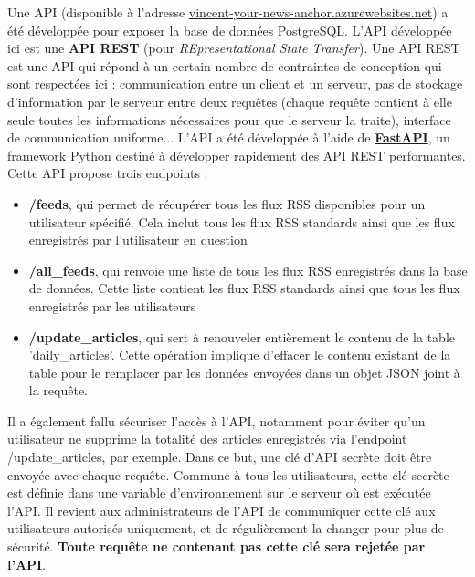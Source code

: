 \documentclass[french]{article}
\begin{document}
    Une API (disponible à l'adresse \href{https://vincent-your-news-anchor.azurewebsites.net/doc}{vincent-your-news-anchor.azurewebsites.net}) a été développée pour exposer la base de données PostgreSQL. L'API développée ici est une \textbf{API REST} (pour \textit{REpresentational State Transfer}). Une API REST est une API qui répond à un certain nombre de contraintes de conception qui sont respectées ici : communication entre un client et un serveur, pas de stockage d'information par le serveur entre deux requêtes (chaque requête contient à elle seule toutes les informations nécessaires pour que le serveur la traite), interface de communication uniforme...
    L'API a été développée à l'aide de \textbf{\href{https://fastapi.tiangolo.com/}{FastAPI}}, un framework Python destiné à développer rapidement des API REST performantes. Cette API propose trois endpoints :
    \begin{itemize}
        \item \textbf{/feeds}, qui permet de récupérer tous les flux RSS disponibles pour un utilisateur spécifié. Cela inclut tous les flux RSS standards ainsi que les flux enregistrés par l'utilisateur en question
        \item \textbf{/all\_feeds}, qui renvoie une liste de tous les flux RSS enregistrés dans la base de données. Cette liste contient les flux RSS standards ainsi que tous les flux enregistrés par les utilisateurs
        \item \textbf{/update\_articles}, qui sert à renouveler entièrement le contenu de la table 'daily\_articles'. Cette opération implique d'effacer le contenu existant de la table pour le remplacer par les données envoyées dans un objet JSON joint à la requête.
    \end{itemize}

    Il a également fallu sécuriser l'accès à l'API, notamment pour éviter qu'un utilisateur ne supprime la totalité des articles enregistrés via l'endpoint /update\_articles, par exemple. Dans ce but, une clé d'API secrète doit être envoyée avec chaque requête. Commune à tous les utilisateurs, cette clé secrète est définie dans une variable d'environnement sur le serveur où est exécutée l'API. Il revient aux administrateurs de l'API de communiquer cette clé aux utilisateurs autorisés uniquement, et de régulièrement la changer pour plus de sécurité. \textbf{Toute requête ne contenant pas cette clé sera rejetée par l'API}.
\end{document}
